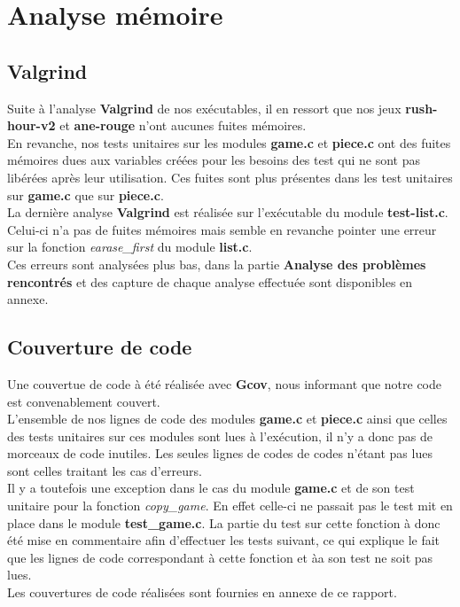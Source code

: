 \documentclass{report}
\begin{document}
\chapter{Analyse mémoire}
\setcounter{section}{0}
\section{Valgrind}
Suite à l'analyse \textbf{Valgrind} de nos exécutables, il en ressort que nos jeux \textbf{rush-hour-v2} et \textbf{ane-rouge} n'ont aucunes fuites mémoires.\\
En revanche, nos tests unitaires sur les modules \textbf{game.c} et \textbf{piece.c} ont des fuites mémoires dues aux variables créées pour les besoins des test qui ne sont pas libérées après leur utilisation. Ces fuites sont plus présentes dans les test unitaires sur \textbf{game.c} que sur \textbf{piece.c}.\\
La dernière analyse \textbf{Valgrind} est réalisée sur l'exécutable du module \textbf{test-list.c}. Celui-ci n'a pas de fuites mémoires mais semble en revanche pointer une erreur sur la fonction \textit{earase\_first} du module \textbf{list.c}.\\
Ces erreurs sont analysées plus bas, dans la partie \textbf{Analyse des problèmes rencontrés} et des capture de chaque analyse effectuée sont disponibles en annexe.

\section{Couverture de code}
Une couvertue de code à été réalisée avec \textbf{Gcov}, nous informant que notre code est convenablement couvert.\\
L'ensemble de nos lignes de code des modules \textbf{game.c} et \textbf{piece.c} ainsi que celles des tests unitaires sur ces modules sont lues à l'exécution, il n'y a donc pas de morceaux de code inutiles. Les seules lignes de codes de codes n'étant pas lues sont celles traitant les cas d'erreurs.\\
Il y a toutefois une exception dans le cas du module \textbf{game.c} et de son test unitaire pour la fonction \textit{copy\_game}. En effet celle-ci ne passait pas le test mit en place dans le module \textbf{test\_game.c}. La partie du test sur cette fonction à donc été mise en commentaire afin d'effectuer les tests suivant, ce qui explique le fait que les lignes de code correspondant à cette fonction et àa son test ne soit pas lues.\\
Les couvertures de code réalisées sont fournies en annexe de ce rapport.
\end{document}
